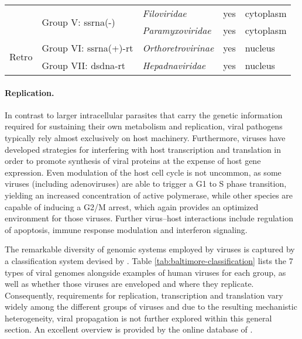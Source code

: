 \begin{table}
\begin{tabular}{c|llll}
    \cline{2-5} &
    \multirow{2}{*}{Group V: \acrshort{ssrna}(-)} &
    \textit{Filoviridae} &
    yes & cytoplasm \\
    &
    & \textit{Paramyxoviridae} &
    yes & cytoplasm \\
    \hline \multirow{2}{*}{\begin{sideways}Retro\end{sideways}} &   
    Group VI: \acrshort{ssrna}(+)-\acrshort{rt} &
    \textit{Orthoretrovirinae} &
    yes & nucleus \\
    \cline{2-5} &
    Group VII: \acrshort{dsdna}-\acrshort{rt} &
    \textit{Hepadnaviridae} &
    yes & nucleus
  \end{tabular}
\end{table}

\paragraph{Replication.}
In contrast to larger intracellular parasites that carry the genetic information required for sustaining their own metabolism and replication, viral pathogens typically rely almost exclusively on host machinery. Furthermore, viruses have developed strategies for interfering with host transcription and translation in order to promote synthesis of viral proteins at the expense of host gene expression. Even modulation of the host cell cycle is not uncommon, as some  viruses (including adenoviruses) are able to trigger a G1 to S phase transition, yielding an increased concentration of active  polymerase, while other species are capable of inducing a G2\slash M arrest, which again provides an optimized environment for those viruses. Further virus--host interactions include regulation of apoptosis, immune response modulation and interferon signaling.

The remarkable diversity of genomic systems employed by viruses is captured by a classification system devised by \citet{Baltimore1971}. Table \ref{tab:baltimore-classification} lists the 7 types of viral genomes alongside examples of human viruses for each group, as well as whether those viruses are enveloped and where they replicate. Consequently, requirements for replication, transcription and translation vary widely among the different groups of viruses and due to the resulting mechanistic heterogeneity, viral propagation is not further explored within this general section. An excellent overview is provided by the online database of \citet{Hulo2011}.

